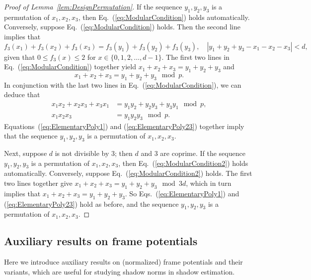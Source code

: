 \documentclass[aps,pra,twocolumn,nofootinbib,superscriptaddress,10pt]{revtex4-2}
\newcommand{\mmod}{\!\mod}
\newcommand{\eref}[1]{Eq.~\textup{(\ref{#1})}}
\newcommand{\eqsref}[2]{Eqs.~(\ref{#1}) and (\ref{#2})}
\newcommand{\Eqsref}[2]{Equations~(\ref{#1}) and (\ref{#2})}
\newcommand{\lref}[1]{Lemma~\ref{#1}}
\begin{document}
\begin{proof}[Proof of \lref{lem:DesignPermutation}]
If the sequence $y_1, y_2, y_3$ is a permutation of $x_1, x_2, x_3$, then \eref{eq:ModularCondition} holds automatically. Conversely, suppose \eref{eq:ModularCondition} holds. Then the second line implies that 
\begin{equation}
f_3(x_1)+f_3(x_2)+f_3(x_3)=f_3(y_1)+f_3(y_2)+f_3(y_3),\quad |y_1+y_2+y_3-x_1-x_2-x_3|<d,
\end{equation}
given that $0\leq f_3(x)\leq 2$ for $x\in \{0,1,2,\ldots, d-1\}$. The first two lines in \eref{eq:ModularCondition} together yield $x_1+x_2+x_3=y_1+y_2+y_3$ and
\begin{equation}\label{eq:ElementaryPoly1}
x_1+x_2+x_3=y_1+y_2+y_3\mmod p.
\end{equation}
In conjunction with the last two lines in \eref{eq:ModularCondition}, we can deduce that
\begin{equation}\label{eq:ElementaryPoly23}
\begin{aligned}
x_1 x_2 +x_2 x_3+x_3x_1 &= y_1 y_2 +y_2 y_3+y_3y_1 \mmod p, \\
x_1 x_2 x_3 &= y_1 y_2 y_3 \mmod p.
\end{aligned}
\end{equation}
\Eqsref{eq:ElementaryPoly1}{eq:ElementaryPoly23} together imply that the sequence $y_1, y_2, y_3$ is a permutation of $x_1, x_2, x_3$.

Next, suppose $d$ is not divisible by 3; then $d$ and 3 are coprime. If the sequence $y_1, y_2, y_3$ is a permutation of $x_1, x_2, x_3$, then \eref{eq:ModularCondition2} holds automatically. Conversely, suppose \eref{eq:ModularCondition2} holds. The first two lines together give $x_1+x_2+x_3=y_1+y_2+y_3 \mmod 3d$, which in turn implies that $x_1+x_2+x_3=y_1+y_2+y_3$. So \eqsref{eq:ElementaryPoly1}{eq:ElementaryPoly23} hold as before, and the sequence $y_1, y_2, y_3$ is a permutation of $x_1, x_2, x_3$.
\end{proof}

\subsection{Auxiliary results on frame potentials}
\label{app:potential}
Here we introduce auxiliary results on (normalized) frame potentials and their variants, which are useful for studying shadow norms in shadow estimation.
\end{document}
